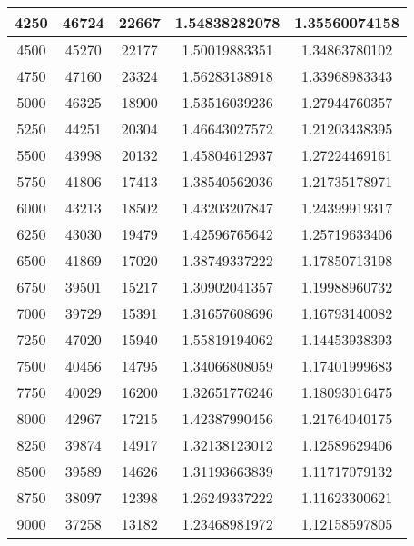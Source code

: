 \begin{table}[H]
\begin{tabular}{|c|c|c|c|c|}
		4250    & 46724        & 22667        & 1.54838282078         &  1.35560074158 \\ \hline
		4500    & 45270        & 22177        & 1.50019883351         &  1.34863780102 \\ \hline
		4750    & 47160        & 23324        & 1.56283138918         &  1.33968983343 \\ \hline
		5000    & 46325        & 18900        & 1.53516039236         &  1.27944760357 \\ \hline
		5250    & 44251        & 20304        & 1.46643027572         &  1.21203438395 \\ \hline
		5500    & 43998        & 20132        & 1.45804612937         &  1.27224469161 \\ \hline
		5750    & 41806        & 17413        & 1.38540562036         &  1.21735178971 \\ \hline
		6000    & 43213        & 18502        & 1.43203207847         &  1.24399919317 \\ \hline
		6250    & 43030        & 19479        & 1.42596765642         &  1.25719633406 \\ \hline
		6500    & 41869        & 17020        & 1.38749337222         &  1.17850713198 \\ \hline
		6750    & 39501        & 15217        & 1.30902041357         &  1.19988960732 \\ \hline
		7000    & 39729        & 15391        & 1.31657608696         &  1.16793140082 \\ \hline
		7250    & 47020        & 15940        & 1.55819194062         &  1.14453938393 \\ \hline
		7500    & 40456        & 14795        & 1.34066808059         &  1.17401999683 \\ \hline
		7750    & 40029        & 16200        & 1.32651776246         &  1.18093016475 \\ \hline
		8000    & 42967        & 17215        & 1.42387990456         &  1.21764040175 \\ \hline
		8250    & 39874        & 14917        & 1.32138123012         &  1.12589629406 \\ \hline
		8500    & 39589        & 14626        & 1.31193663839         &  1.11717079132 \\ \hline
		8750    & 38097        & 12398        & 1.26249337222         &  1.11623300621 \\ \hline
		9000    & 37258        & 13182        & 1.23468981972         &  1.12158597805 \\ \hline

\end{tabular}
\end{table}
